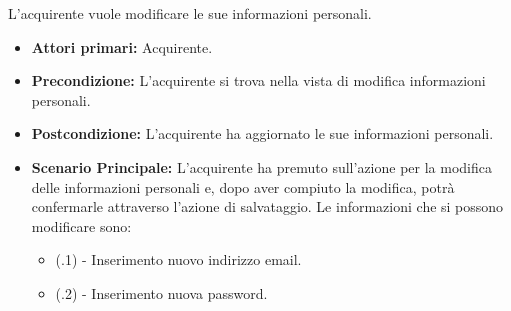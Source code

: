 


L'acquirente vuole modificare le sue informazioni personali.
\begin{itemize}
    \item \textbf{Attori primari:} Acquirente.
    \item \textbf{Precondizione:} L'acquirente si trova nella vista di modifica informazioni personali.
    \item \textbf{Postcondizione:} L'acquirente ha aggiornato le sue informazioni personali.
    \item \textbf{Scenario Principale:} L'acquirente ha premuto sull'azione per la modifica delle informazioni personali e, dopo aver compiuto la modifica, potrà confermarle attraverso l'azione di salvataggio. Le informazioni che si possono modificare sono:
    \begin{itemize}
        \item (\actualUC.1) - Inserimento nuovo indirizzo email.
        \item (\actualUC.2) - Inserimento nuova password.
    \end{itemize}
\end{itemize}

\resetSubUC

